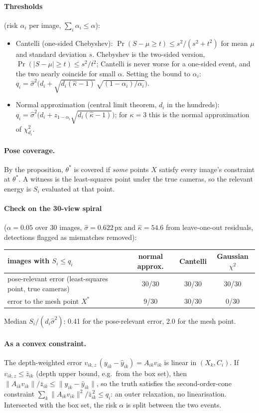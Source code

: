\documentclass[11pt]{article}
\begin{document}
\paragraph{Thresholds} (risk $\alpha_i$ per image, $\sum_i\alpha_i\le\alpha$):
\begin{itemize}
\item Cantelli (one-sided Chebyshev): $\Pr(S-\mu\ge t)\le s^2/(s^2+t^2)$ for mean $\mu$ and standard deviation $s$.
  Chebyshev is the two-sided version, $\Pr(|S-\mu|\ge t)\le s^2/t^2$; Cantelli is never worse for a one-sided event,
  and the two nearly coincide for small $\alpha$. Setting the bound to $\alpha_i$:
  $q_i=\hat\sigma^2\bigl(d_i+\sqrt{d_i(\hat\kappa-1)}\,\sqrt{(1-\alpha_i)/\alpha_i}\bigr)$.
\item Normal approximation (central limit theorem, $d_i$ in the hundreds):
  $q_i=\hat\sigma^2\bigl(d_i+z_{1-\alpha_i}\sqrt{d_i(\hat\kappa-1)}\bigr)$; for $\kappa=3$ this is the normal approximation of $\chi^2_{d_i}$.
\end{itemize}

\paragraph{Pose coverage.} By the proposition, $\theta^*$ is covered if \emph{some} points $X$ satisfy every
image's constraint at $\theta^*$. A witness is the least-squares point under the true cameras, so the relevant energy is
$S_i$ evaluated at that point.

\paragraph{Check on the 30-view spiral} ($\alpha=0.05$ over 30 images, $\hat\sigma=0.622$\,px and $\hat\kappa=54.6$
from leave-one-out residuals, detections flagged as mismatches removed):
\begin{center}
\begin{tabular}{lccc}
\toprule
images with $S_i\le q_i$ & normal approx. & Cantelli & Gaussian $\chi^2$\\
\midrule
pose-relevant error (least-squares point, true cameras) & 30/30 & 30/30 & 30/30\\
error to the mesh point $X^*$ & 9/30 & 30/30 & 0/30\\
\bottomrule
\end{tabular}
\end{center}
Median $S_i/(d_i\hat\sigma^2)$: 0.41 for the pose-relevant error, 2.0 for the mesh point.

\paragraph{As a convex constraint.} The depth-weighted error $v_{ik,z}\,(y_{ik}-\hat y_{ik})=A_{ik}v_{ik}$ is linear in
$(X_k,C_i)$. If $v_{ik,z}\le\bar z_{ik}$ (depth upper bound, e.g.\ from the box set), then
$\|A_{ik}v_{ik}\|/\bar z_{ik}\le\|y_{ik}-\hat y_{ik}\|$, so the truth satisfies the second-order-cone constraint
$\sum_k\|A_{ik}v_{ik}\|^2/\bar z_{ik}^{\,2}\le q_i$: an outer relaxation, no linearisation. Intersected with the box set,
the risk $\alpha$ is split between the two events.
\end{document}
